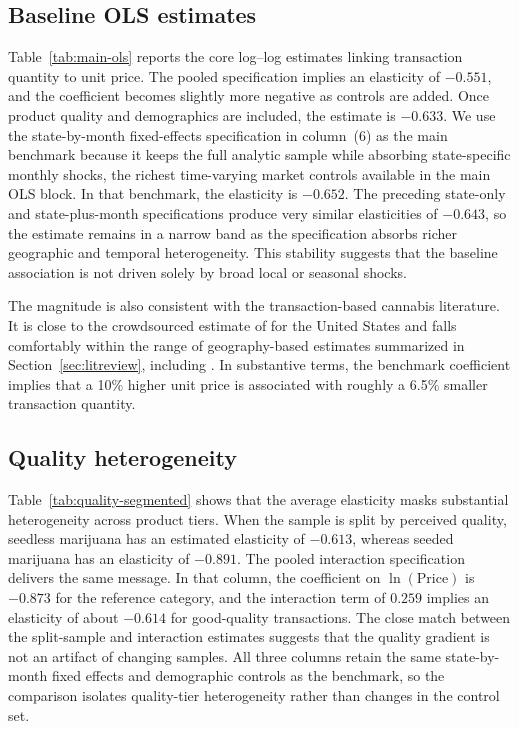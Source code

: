 
\subsection{Baseline OLS estimates}

Table~\ref{tab:main-ols} reports the core log--log estimates linking transaction quantity to unit price.  The pooled specification implies an elasticity of $-0.551$, and the coefficient becomes slightly more negative as controls are added.  Once product quality and demographics are included, the estimate is $-0.633$.  We use the state-by-month fixed-effects specification in column~(6) as the main benchmark because it keeps the full analytic sample while absorbing state-specific monthly shocks, the richest time-varying market controls available in the main OLS block.  In that benchmark, the elasticity is $-0.652$.  The preceding state-only and state-plus-month specifications produce very similar elasticities of $-0.643$, so the estimate remains in a narrow band as the specification absorbs richer geographic and temporal heterogeneity.  This stability suggests that the baseline association is not driven solely by broad local or seasonal shocks.

The magnitude is also consistent with the transaction-based cannabis literature.  It is close to the crowdsourced estimate of \citet{davis2016crowd} for the United States and falls comfortably within the range of geography-based estimates summarized in Section~\ref{sec:litreview}, including \citet{halcoussis2017geo}.  In substantive terms, the benchmark coefficient implies that a 10\% higher unit price is associated with roughly a 6.5\% smaller transaction quantity. 



\subsection{Quality heterogeneity}

Table~\ref{tab:quality-segmented} shows that the average elasticity masks substantial heterogeneity across product tiers.  When the sample is split by perceived quality, seedless marijuana has an estimated elasticity of $-0.613$, whereas seeded marijuana has an elasticity of $-0.891$.  The pooled interaction specification delivers the same message.  In that column, the coefficient on $\ln(\text{Price})$ is $-0.873$ for the reference category, and the interaction term of $0.259$ implies an elasticity of about $-0.614$ for good-quality transactions.  The close match between the split-sample and interaction estimates suggests that the quality gradient is not an artifact of changing samples.  All three columns retain the same state-by-month fixed effects and demographic controls as the benchmark, so the comparison isolates quality-tier heterogeneity rather than changes in the control set.

